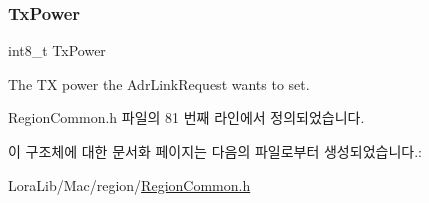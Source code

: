 \subsubsection{\texorpdfstring{Tx\+Power}{TxPower}}
{\footnotesize\ttfamily int8\+\_\+t Tx\+Power}

The TX power the Adr\+Link\+Request wants to set. 

Region\+Common.\+h 파일의 81 번째 라인에서 정의되었습니다.



이 구조체에 대한 문서화 페이지는 다음의 파일로부터 생성되었습니다.\+:\begin{DoxyCompactItemize}
\item 
Lora\+Lib/\+Mac/region/\mbox{\hyperlink{_region_common_8h}{Region\+Common.\+h}}\end{DoxyCompactItemize}
